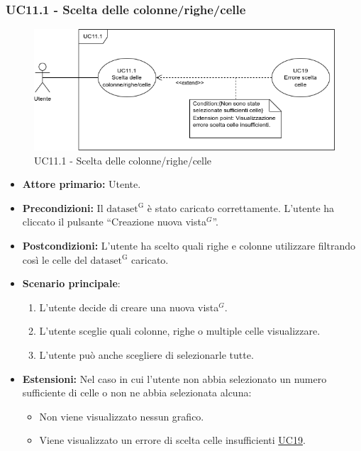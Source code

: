 \subsubsection{UC11.1 - Scelta delle colonne/righe/celle}
\label{sec:UC11.1}
\begin{figure}[H]
    \centering
    \includegraphics[scale=0.60]{../../assets/scelta_colonne_righe.png}
    \caption{UC11.1 - Scelta delle colonne/righe/celle}
\end{figure}

\begin{itemize}
    \item \textbf{Attore primario:} Utente.
    \item \textbf{Precondizioni:} Il ${\mathrm{dataset^{G}}}$ è stato caricato correttamente. L'utente ha cliccato il pulsante ``Creazione nuova vista$^{G}$''.
    \item \textbf{Postcondizioni:} L'utente ha scelto quali righe e colonne utilizzare filtrando così le celle del ${\mathrm{dataset^{G}}}$ caricato.
    \item \textbf{Scenario principale}:
    \begin{enumerate}
		\item L'utente decide di creare una nuova vista$^{G}$.
		\item L'utente sceglie quali colonne, righe o multiple celle visualizzare.
		\item L'utente può anche scegliere di selezionarle tutte.
	\end{enumerate}
	\item \textbf{Estensioni:} Nel caso in cui l'utente non abbia selezionato un numero sufficiente di celle o non ne abbia selezionata alcuna:
              \begin{itemize}
                  \item Non viene visualizzato nessun grafico.
                  \item Viene visualizzato un errore di scelta celle insufficienti \hyperref[sec:UC19 - Errore-celle-insufficienti]{UC19}.
              \end{itemize}
\end{itemize}


